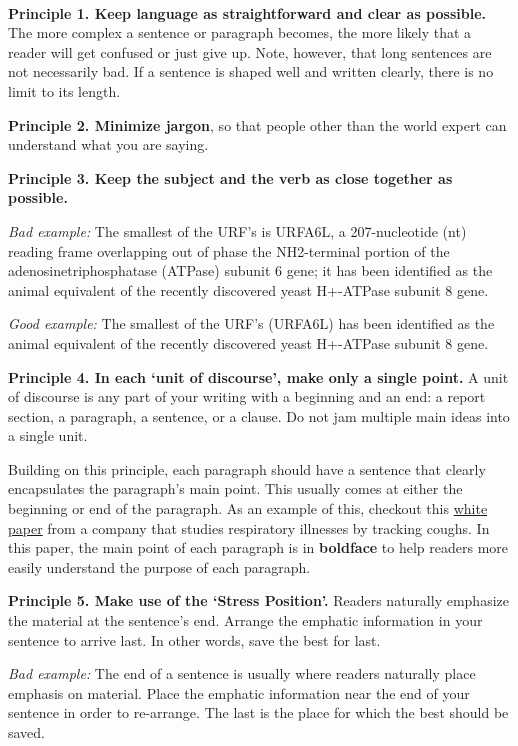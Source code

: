 \documentclass[]{book}
\begin{document}
~

\textbf{Principle 1. Keep language as straightforward and clear as possible.} The more complex a sentence or paragraph becomes, the more likely that a reader will get confused or just give up. Note, however, that long sentences are not necessarily bad. If a sentence is shaped well and written clearly, there is no limit to its length.

\textbf{Principle 2. Minimize jargon}, so that people other than the world expert can understand what you are saying.

\textbf{Principle 3. Keep the subject and the verb as close together as possible.}

\emph{Bad example:} The smallest of the URF's is URFA6L, a 207-nucleotide (nt) reading frame overlapping out of phase the NH2-terminal portion of the adenosinetriphosphatase (ATPase) subunit 6 gene; it has been identified as the animal equivalent of the recently discovered yeast H+-ATPase subunit 8 gene.

\emph{Good example:} The smallest of the URF's (URFA6L) has been identified as the animal equivalent of the recently discovered yeast H+-ATPase subunit 8 gene.

\textbf{Principle 4. In each `unit of discourse', make only a single point.} A unit of discourse is any part of your writing with a beginning and an end: a report section, a paragraph, a sentence, or a clause. Do not jam multiple main ideas into a single unit.

Building on this principle, each paragraph should have a sentence that clearly encapsulates the paragraph's main point. This usually comes at either the beginning or end of the paragraph. As an example of this, checkout this \href{https://uploads-ssl.webflow.com/601331581ba868154325e525/604287b91aab4e5c89de8e0e_Hyfe\%20Smart\%20Cough\%20Monitoring.pdf}{white paper} from a company that studies respiratory illnesses by tracking coughs. In this paper, the main point of each paragraph is in \textbf{boldface} to help readers more easily understand the purpose of each paragraph.

\textbf{Principle 5. Make use of the `Stress Position'.} Readers naturally emphasize the material at the sentence's end. Arrange the emphatic information in your sentence to arrive last. In other words, save the best for last.

\emph{Bad example:} The end of a sentence is usually where readers naturally place emphasis on material. Place the emphatic information near the end of your sentence in order to re-arrange. The last is the place for which the best should be saved.
\end{document}

